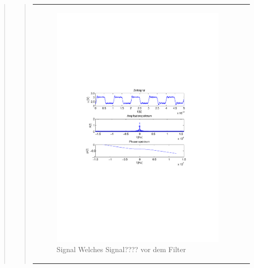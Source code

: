 \begin{quote}
\begin{quote}
         \begin{center}
            \begin{tabular}{ll}
            
            \hspace{-5cm}
                \begin{minipage}{0.67\textwidth}
                    \begin{figure}[H]
                        \label{fig:vor Filter}
                        \includegraphics[scale=0.7, trim = 35mm 100mm 35mm 95mm, clip]{Bilder/f1filB}
                        \caption{Signal Welches Signal???? vor dem Filter}
                    \end{figure}
                \end{minipage}
                

\end{tabular}
\end{center}
\end{quote}
\end{quote}
